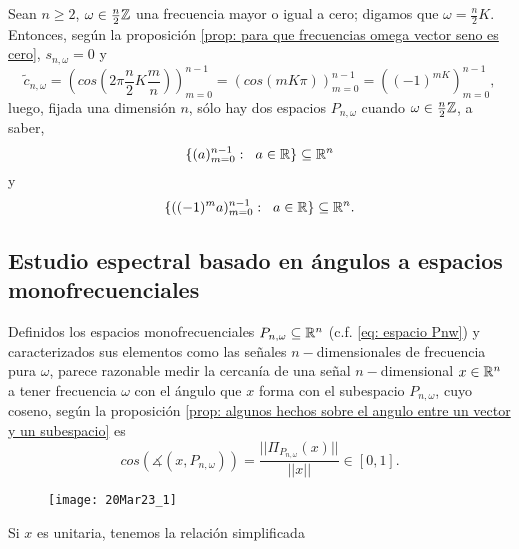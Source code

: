 \begin{nota}
Sean $n \geq 2$, $\omega \in \frac{n}{2} \mathbb{Z}$ 
una frecuencia
mayor o igual a cero; digamos que 
$\omega = \frac{n}{2}K$. Entonces, 
según la proposición 
\ref{prop: para que frecuencias omega vector seno es cero},
$s_{n, \omega} =0$ y
\[
\tilde{c}_{n, \omega} = \left(cos\left( 2 \pi \frac{n}{2}K \frac{m}{n}\right)
\right)_{m=0}^{n-1}
= (cos(mK \pi))_{m = 0}^{n-1} = ((-1)^{mK})_{m=0}^{n-1},
\]
luego, 
fijada una dimensión $n$, sólo hay dos espacios
$P_{n, \omega}$ cuando 
$\omega \in \frac{n}{2} \mathbb{Z}$,
a saber,
\[
\{ (a)_{m=0}^{n-1} : \hspace{0.2cm} a \in \mathbb{R} \} \subseteq \mathbb{R}^{n}
\]
y
\[
\{ ((-1)^{m}a)_{m=0}^{n-1} : \hspace{0.2cm} a \in \mathbb{R} \} \subseteq \mathbb{R}^{n}.
\]

\end{nota}



\subsection{Estudio espectral basado en ángulos a espacios monofrecuenciales}

Definidos los espacios monofrecuenciales
$P_{n, \omega} \subseteq \mathbb{R}^{n}$ 
(c.f. \eqref{eq: espacio Pnw})
y caracterizados sus elementos como las señales
$n-$dimensionales de frecuencia pura $\omega$,
parece razonable
medir la cercanía de una señal $n-$dimensional $x \in \mathbb{R}^{n}$
a tener frecuencia $\omega$
con el ángulo que $x$ forma con el subespacio $P_{n, \omega}$,
cuyo coseno, según la proposición
\ref{prop: algunos hechos sobre el angulo entre un vector y un subespacio}
es
\begin{equation}
\label{eq0: 20Mar}
cos \left( \measuredangle (x, P_{n, \omega}) \right) = 
\frac{|| \Pi_{P_{n, \omega}}(x) ||}{||x||}
\in [0,1].
\end{equation}


\begin{figure}[H]
	\centering
	\texttt{[image: 20Mar23\_1]} 
\end{figure}	

Si $x$ es unitaria,
tenemos la relación simplificada 

